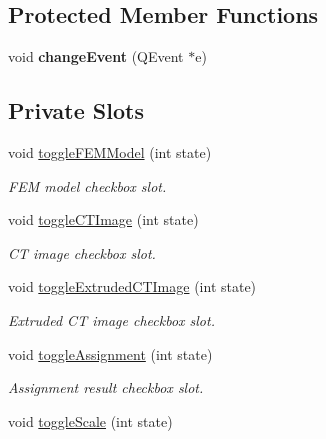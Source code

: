 \subsection*{Protected Member Functions}
\begin{DoxyCompactItemize}
\item 
\hypertarget{classgui_1_1_main_window_a62731a7857ecd07560e53a7b4cf0bd8b}{
void {\bfseries changeEvent} (QEvent $\ast$e)}
\label{classgui_1_1_main_window_a62731a7857ecd07560e53a7b4cf0bd8b}

\end{DoxyCompactItemize}
\subsection*{Private Slots}
\begin{DoxyCompactItemize}
\item 
void \hyperlink{classgui_1_1_main_window_ab6bc66d6d29c8ce9c25e42d23ca5796d}{toggleFEMModel} (int state)
\begin{DoxyCompactList}\small\item\em FEM model checkbox slot. \item\end{DoxyCompactList}\item 
void \hyperlink{classgui_1_1_main_window_a55e08f5a8915bb4838bdbd31b2bdaf4c}{toggleCTImage} (int state)
\begin{DoxyCompactList}\small\item\em CT image checkbox slot. \item\end{DoxyCompactList}\item 
void \hyperlink{classgui_1_1_main_window_a5102f72743b8fd8f6989eb339067e73f}{toggleExtrudedCTImage} (int state)
\begin{DoxyCompactList}\small\item\em Extruded CT image checkbox slot. \item\end{DoxyCompactList}\item 
void \hyperlink{classgui_1_1_main_window_ac3f9bab09dfb3646b0ee1be0bd613f20}{toggleAssignment} (int state)
\begin{DoxyCompactList}\small\item\em Assignment result checkbox slot. \item\end{DoxyCompactList}\item 
void \hyperlink{classgui_1_1_main_window_a4646ba0d34c86dfe969b285b00c30d5e}{toggleScale} (int state)

\end{DoxyCompactItemize}
